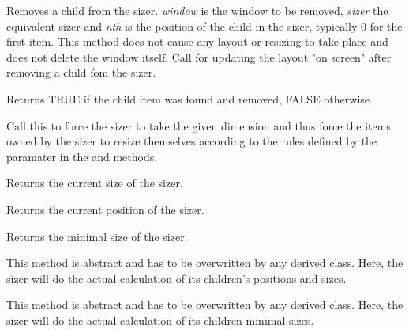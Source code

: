 
Removes a child from the sizer. {\it window} is the window to be removed, {\it sizer} the
equivalent sizer and {\it nth} is the position of the child in the sizer, typically 0 for
the first item. This method does not cause any layout or resizing to take place and does
not delete the window itself. Call  for updating
the layout "on screen" after removing a child fom the sizer.

Returns TRUE if the child item was found and removed, FALSE otherwise.

\label{wxsizersetdimension}


Call this to force the sizer to take the given dimension and thus force the items owned
by the sizer to resize themselves according to the rules defined by the paramater in the
 and  methods.

\label{wxsizergetsize}


Returns the current size of the sizer.

\label{wxsizergetposition}


Returns the current position of the sizer.

\label{wxsizergetminsize}


Returns the minimal size of the sizer.

\label{wxsizerrecalcsizes}


This method is abstract and has to be overwritten by any derived class.
Here, the sizer will do the actual calculation of its children's positions
and sizes.

\label{wxsizercalcmin}


This method is abstract and has to be overwritten by any derived class.
Here, the sizer will do the actual calculation of its children minimal sizes.

